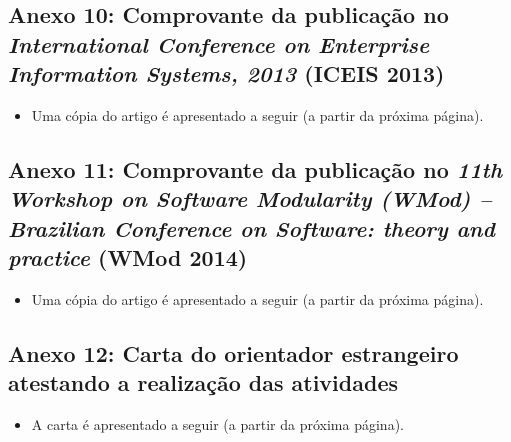 
\subsection*{Anexo 10: Comprovante da publicação no \emph{International Conference on Enterprise Information Systems, 2013 } (ICEIS 2013)} \label{anexo:comprovante_ICEIS_paulo}

\begin{itemize}
	\item Uma cópia do artigo é apresentado a seguir (a partir da próxima página).
\end{itemize}
\clearpage



\subsection*{Anexo 11: Comprovante da publicação no \emph{11th Workshop on Software Modularity (WMod) -- Brazilian Conference on Software: theory and practice } (WMod 2014)} \label{anexo:comprovante_WMOD}

\begin{itemize}
	\item Uma cópia do artigo é apresentado a seguir (a partir da próxima página).
\end{itemize}
\clearpage


\subsection*{Anexo 12: Carta do orientador estrangeiro atestando a realização das atividades} \label{anexo:comprovante_nicolas}
\begin{itemize}
	\item A carta é apresentado a seguir (a partir da próxima página).
\end{itemize}
\clearpage
